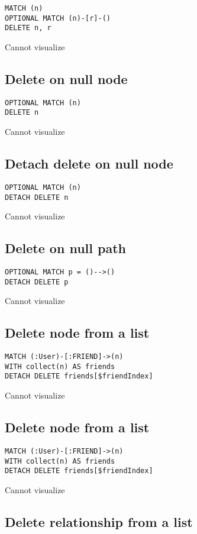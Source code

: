 \begin{lstlisting}
MATCH (n)
OPTIONAL MATCH (n)-[r]-()
DELETE n, r
\end{lstlisting}

Cannot visualize
\subsection{Delete on null node}

\begin{lstlisting}
OPTIONAL MATCH (n)
DELETE n
\end{lstlisting}

Cannot visualize
\subsection{Detach delete on null node}

\begin{lstlisting}
OPTIONAL MATCH (n)
DETACH DELETE n
\end{lstlisting}

Cannot visualize
\subsection{Delete on null path}

\begin{lstlisting}
OPTIONAL MATCH p = ()-->()
DETACH DELETE p
\end{lstlisting}

Cannot visualize
\subsection{Delete node from a list}

\begin{lstlisting}
MATCH (:User)-[:FRIEND]->(n)
WITH collect(n) AS friends
DETACH DELETE friends[$friendIndex]
\end{lstlisting}

Cannot visualize
\subsection{Delete node from a list}

\begin{lstlisting}
MATCH (:User)-[:FRIEND]->(n)
WITH collect(n) AS friends
DETACH DELETE friends[$friendIndex]
\end{lstlisting}

Cannot visualize
\subsection{Delete relationship from a list}

